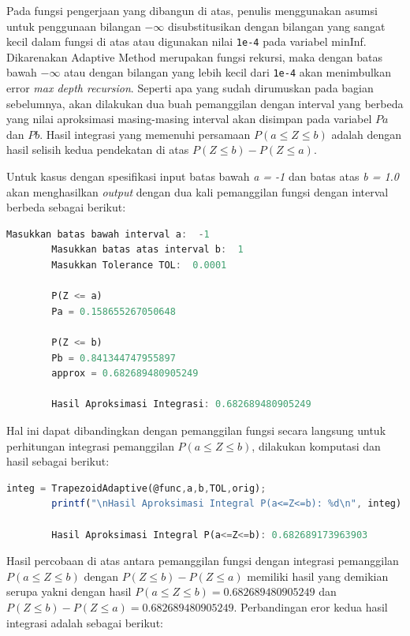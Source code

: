 \documentclass[journal,12pt,onecolumn,a4paper]{IEEEtran}
\begin{document}
Pada fungsi pengerjaan yang dibangun di atas, penulis menggunakan asumsi untuk penggunaan bilangan \(-\infty\) disubstitusikan dengan bilangan yang sangat kecil dalam fungsi di atas atau digunakan nilai \lstinline{1e-4} pada variabel minInf. Dikarenakan Adaptive Method merupakan fungsi rekursi, maka dengan batas bawah \(-\infty\) atau dengan bilangan yang lebih kecil dari \lstinline{1e-4} akan menimbulkan error \emph{max depth recursion}.
Seperti apa yang sudah dirumuskan pada bagian sebelumnya, akan dilakukan dua buah pemanggilan dengan interval yang berbeda yang nilai aproksimasi masing-masing interval akan disimpan pada variabel \(Pa\) dan \(Pb\). Hasil integrasi yang memenuhi persamaan \(P(a \le Z \le b)\) adalah dengan hasil selisih kedua pendekatan di atas \(P(Z \le b ) - P(Z \le a )\).

Untuk kasus dengan spesifikasi input batas bawah \emph{a = -1} dan batas atas \emph{b = 1.0} akan menghasilkan \emph{output} dengan dua kali pemanggilan fungsi dengan interval berbeda sebagai berikut:

\begin{center}
	\begin{lstlisting}[language=Octave]
		Masukkan batas bawah interval a:  -1
		Masukkan batas atas interval b:  1
		Masukkan Tolerance TOL:  0.0001

		P(Z <= a)
		Pa = 0.158655267050648

		P(Z <= b)
		Pb = 0.841344747955897
		approx = 0.682689480905249

		Hasil Aproksimasi Integrasi: 0.682689480905249

	\end{lstlisting}
\end{center}

Hal ini dapat dibandingkan dengan pemanggilan fungsi secara langsung untuk perhitungan integrasi pemanggilan \(P(a \le Z \le b)\), dilakukan komputasi dan hasil sebagai berikut:
\begin{center}
	\begin{lstlisting}[language=Octave]
		integ = TrapezoidAdaptive(@func,a,b,TOL,orig);
		printf("\nHasil Aproksimasi Integral P(a<=Z<=b): %d\n", integ)

		Hasil Aproksimasi Integral P(a<=Z<=b): 0.682689173963903
	\end{lstlisting}
\end{center}

Hasil percobaan di atas antara pemanggilan fungsi dengan integrasi pemanggilan \(P(a \le Z \le b)\) dengan \(P(Z \le b ) - P(Z \le a )\) memiliki hasil yang demikian serupa yakni dengan hasil \(P(a \le Z \le b)= 0.682689480905249\)  dan \(P(Z \le b ) - P(Z \le a ) = 0.682689480905249\). Perbandingan eror kedua hasil integrasi adalah sebagai berikut:
\end{document}
